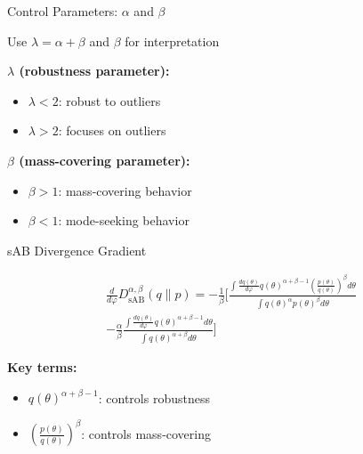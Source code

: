 \documentclass{beamer}
\theoremstyle{definition}
\theoremstyle{plain}
\begin{document}
\begin{frame}{Control Parameters: $\alpha$ and $\beta$}

Use $\lambda = \alpha + \beta$ and $\beta$ for interpretation

\vspace{0.3cm}

\textbf{$\lambda$ (robustness parameter):}
\begin{itemize}
    \item $\lambda < 2$: robust to outliers
    \item $\lambda > 2$: focuses on outliers
\end{itemize}

\vspace{0.3cm}

\textbf{$\beta$ (mass-covering parameter):}
\begin{itemize}
    \item $\beta > 1$: mass-covering behavior
    \item $\beta < 1$: mode-seeking behavior
\end{itemize}

\vspace{0.3cm}

\end{frame}
\begin{frame}{sAB Divergence Gradient}

\begin{multline*}
\frac{d}{d\varphi} D^{\alpha,\beta}_{\text{sAB}}(q\|p) = -\frac{1}{\beta} \Bigg[ \frac{\int \frac{dq(\theta)}{d\varphi} q(\theta)^{\alpha+\beta-1} \left(\frac{p(\theta)}{q(\theta)}\right)^{\beta} d\theta}{\int q(\theta)^{\alpha} p(\theta)^{\beta} d\theta} \\
- \frac{\alpha}{\beta} \frac{\int \frac{dq(\theta)}{d\varphi} q(\theta)^{\alpha+\beta-1} d\theta}{\int q(\theta)^{\alpha+\beta} d\theta} \Bigg]
\end{multline*}

\vspace{0.3cm}

\textbf{Key terms:}
\begin{itemize}
    \item $q(\theta)^{\alpha+\beta-1}$: controls robustness
    \item $\left(\frac{p(\theta)}{q(\theta)}\right)^{\beta}$: controls mass-covering
\end{itemize}

\end{frame}
\end{document}
